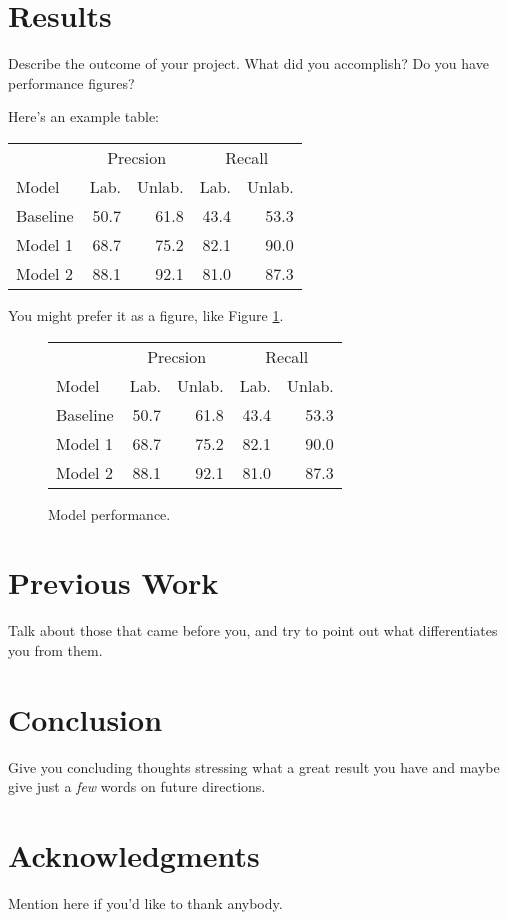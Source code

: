 \documentclass[11pt]{article}
\begin{document}
\section{Results}

Describe the outcome of your project. What did you accomplish? Do you
have performance figures?

Here's an example table:

\begin{center}
\begin{tabular}{l|rr|rr}
& \multicolumn{2}{c|}{Precsion} & \multicolumn{2}{c}{Recall}\\
Model    & Lab.   &  Unlab. &  Lab.   &  Unlab.   \\ \hline
Baseline & 50.7   &  61.8   &  43.4   &  53.3     \\
Model 1  & 68.7   &  75.2   &  82.1   &  90.0     \\
Model 2  & 88.1   &  92.1   &  81.0   &  87.3     
\end{tabular}
\end{center}

You might prefer it as a figure, like Figure \ref{fig:model perf}.

\begin{figure}
\begin{center}
\begin{tabular}{l|rr|rr}
& \multicolumn{2}{c|}{Precsion} & \multicolumn{2}{c}{Recall}\\
Model    & Lab.   &  Unlab. &  Lab.   &  Unlab.   \\ \hline
Baseline & 50.7   &  61.8   &  43.4   &  53.3     \\
Model 1  & 68.7   &  75.2   &  82.1   &  90.0     \\
Model 2  & 88.1   &  92.1   &  81.0   &  87.3     
\end{tabular}
\end{center}
\caption{Model performance.}
\label{fig:model perf}
\end{figure}



\section{Previous Work}

Talk about those that came before you, and try to point out what
differentiates you from them.


\section{Conclusion}

Give you concluding thoughts stressing what a great result you have
and maybe give just a {\it few} words on future directions.



\section*{Acknowledgments} 
Mention here if you'd like to thank anybody.

\begin{small}

\end{small}
\end{document}
